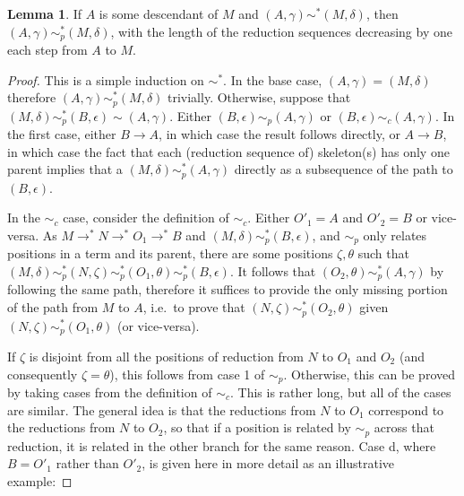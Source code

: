 \documentclass{article}
\theoremstyle{definition}
\theoremstyle{lemma}
\newtheorem{lemma}{Lemma}
\theoremstyle{remark}
\begin{document}
\begin{lemma} \label{simpDoesn'tMix}
If $A$ is some descendant of $M$ and $(A,\gamma) \sim^* (M,\delta)$, then $(A,\gamma) \sim_p^* (M,\delta)$, with the length of the reduction sequences decreasing by one each step from $A$ to $M$.
\end{lemma}
\begin{proof}
This is a simple induction on $\sim^*$. In the base case, $(A,\gamma) = (M,\delta)$ therefore $(A,\gamma) \sim_p^* (M,\delta)$ trivially. Otherwise, suppose that $(M,\delta) \sim_p^* (B,\epsilon) \sim (A,\gamma)$. Either $(B,\epsilon) \sim_p (A,\gamma)$ or $(B,\epsilon) \sim_c (A,\gamma)$. In the first case, either $B \to A$, in which case the result follows directly, or $A \to B$, in which case the fact that each (reduction sequence of) skeleton(s) has only one parent implies that a $(M,\delta) \sim_p^* (A,\gamma)$ directly as a subsequence of the path to $(B,\epsilon)$.

In the $\sim_c$ case, consider the definition of $\sim_c$. Either $O'_1 = A$ and $O'_2 = B$ or vice-versa. As $M \to^* N \to^* O_1 \to^* B$ and $(M,\delta) \sim_p^* (B,\epsilon)$, and $\sim_p$ only relates positions in a term and its parent, there are some positions $\zeta, \theta$ such that $(M,\delta) \sim_p^* (N,\zeta) \sim_p^* (O_1, \theta) \sim_p^* (B,\epsilon)$. It follows that $(O_2, \theta) \sim_p^* (A,\gamma)$ by following the same path, therefore it suffices to provide the only missing portion of the path from $M$ to $A$, i.e.~to prove that $(N,\zeta) \sim_p^* (O_2,\theta)$ given $(N,\zeta) \sim_p^* (O_1,\theta)$ (or vice-versa).

If $\zeta$ is disjoint from all the positions of reduction from $N$ to $O_1$ and $O_2$ (and consequently $\zeta = \theta$), this follows from case 1 of $\sim_p$. Otherwise, this can be proved by taking cases from the definition of $\sim_c$. This is rather long, but all of the cases are similar. The general idea is that the reductions from $N$ to $O_1$ correspond to the reductions from $N$ to $O_2$, so that if a position is related by $\sim_p$ across that reduction, it is related in the other branch for the same reason. Case d, where $B = O'_1$ rather than $O'_2$, is given here in more detail as an illustrative example:


\end{proof}
\end{document}
